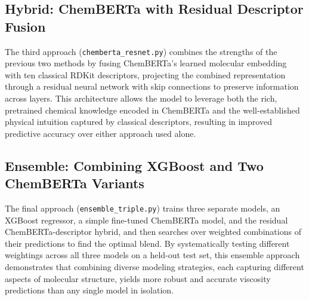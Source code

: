 \documentclass{article}
\begin{document}
\subsection{Hybrid: ChemBERTa with Residual Descriptor Fusion}
The third approach (\texttt{chemberta\_resnet.py}) combines the strengths of the previous two methods by fusing ChemBERTa's learned molecular embedding with ten classical RDKit descriptors, projecting the combined representation through a residual neural network with skip connections to preserve information across layers. This architecture allows the model to leverage both the rich, pretrained chemical knowledge encoded in ChemBERTa and the well-established physical intuition captured by classical descriptors, resulting in improved predictive accuracy over either approach used alone.

\subsection{Ensemble: Combining XGBoost and Two ChemBERTa Variants}
The final approach (\texttt{ensemble\_triple.py}) trains three separate models, an XGBoost regressor, a simple fine-tuned ChemBERTa model, and the residual ChemBERTa-descriptor hybrid, and then searches over weighted combinations of their predictions to find the optimal blend. By systematically testing different weightings across all three models on a held-out test set, this ensemble approach demonstrates that combining diverse modeling strategies, each capturing different aspects of molecular structure, yields more robust and accurate viscosity predictions than any single model in isolation.
\end{document}
